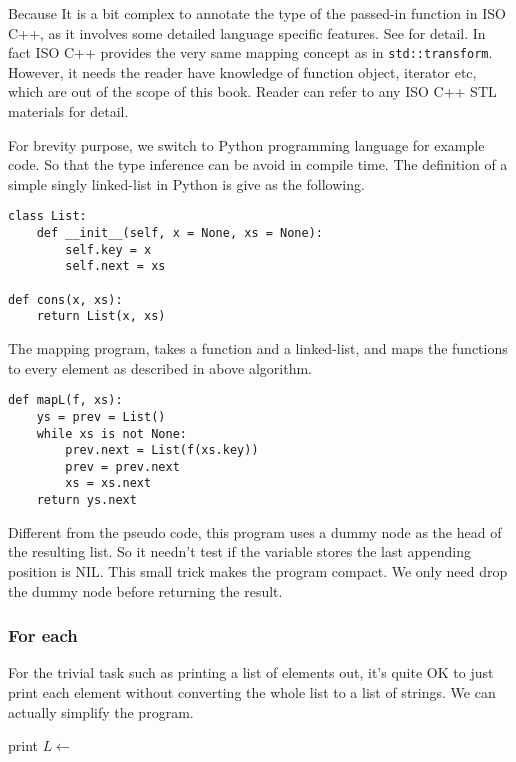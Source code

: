 \documentclass[UTF8]{article}
\begin{document}
Because It is a bit complex to annotate the type of the passed-in function in ISO C++, as it
involves some detailed language specific features. See \cite{sgi-stl-transform} for detail.
In fact ISO C++ provides the very same mapping concept as in \verb|std::transform|. However,
it needs the reader have knowledge of function object, iterator etc, which are out of the
scope of this book. Reader can refer to any ISO C++ STL materials for detail.

For brevity purpose, we switch to Python programming language for example code. So that the type inference
can be avoid in compile time. The definition of a simple singly linked-list in Python is give as the
following.

\lstset{language=Python}
\begin{lstlisting}
class List:
    def __init__(self, x = None, xs = None):
        self.key = x
        self.next = xs

def cons(x, xs):
    return List(x, xs)
\end{lstlisting}

The mapping program, takes a function and a linked-list, and maps the functions to every element as described
in above algorithm.

\begin{lstlisting}
def mapL(f, xs):
    ys = prev = List()
    while xs is not None:
        prev.next = List(f(xs.key))
        prev = prev.next
        xs = xs.next
    return ys.next
\end{lstlisting}

Different from the pseudo code, this program uses a dummy node as the head of the resulting list. So it needn't
test if the variable stores the last appending position is NIL. This small trick makes the program compact.
We only need drop the dummy node before returning the result.

\subsubsection{For each}

For the trivial task such as printing a list of elements out, it's quite OK to just print each element without
converting the whole list to a list of strings. We can actually simplify the program.

\begin{algorithmic}[1]
    \State print 
    \State $L \gets$ 
  \EndWhile
\EndFunction
\end{algorithmic}
\end{document}
